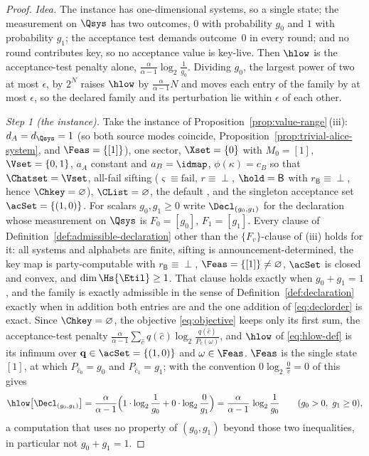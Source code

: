 \begin{proof}
\emph{Idea.} The instance has one-dimensional systems, so a single state;
the measurement on $\Qsys$ has two outcomes, $0$ with probability $g_0$
and $1$ with probability $g_1$; the acceptance test demands outcome~$0$ in
every round; and no round contributes key, so no acceptance value is
key-live. Then $\hlow$ is the acceptance-test penalty alone,
$\frac{\alpha}{\alpha-1}\log_2\frac1{g_0}$. Dividing $g_0$, the largest
power of two at most $\epsilon$, by $2^{N}$ raises $\hlow$ by
$\frac{\alpha}{\alpha-1}N$ and moves each entry of the family by at most
$\epsilon$, so the declared family and its perturbation lie within
$\epsilon$ of each other.

\emph{Step 1 (the instance).} Take the instance of
Proposition~\ref{prop:value-range}\,(iii): $d_A=d_{\Qsys}=1$ (so both source modes
coincide, Proposition~\ref{prop:trivial-alice-system}, and $\Feas=\{[1]\}$), one
sector, $\Xset=\{0\}$ with $M_0=[1]$, $\Vset=\{0,1\}$, $a_A$ constant and
$a_B=\idmap$, $\phi(\kappa)=c_B$ so that $\Chatset=\Vset$, all-fail
sifting ($\varsigma\equiv\mathrm{fail}$, $r\equiv\perp$, $\hold=\mathsf B$
with $r_{\mathsf B}\equiv\perp$, hence $\Chkey=\varnothing$),
$\CList=\varnothing$, the default , and the singleton
acceptance set $\acSet=\{(1,0)\}$. For scalars $g_0,g_1\ge0$ write
$\Decl_{(g_0,g_1)}$ for the declaration whose measurement on $\Qsys$ is
$F_0=[g_0]$, $F_1=[g_1]$. Every clause of Definition~\ref{def:admissible-declaration} other
than the $\{F_v\}$-clause of (iii) holds for it: all systems and
alphabets are finite, sifting is announcement-determined, the key map is
party-computable with $r_{\mathsf B}\equiv\perp$,
$\Feas=\{[1]\}\ne\varnothing$, $\acSet$ is closed and convex, and
$\dim\Hs{\Etil}\ge1$. That clause holds exactly when $g_0+g_1=1$, and the
family is exactly admissible in the sense of
Definition~\ref{def:declaration} exactly when in addition both entries are
 and the one addition of \eqref{eq:declorder} is exact.
Since $\Chkey=\varnothing$, the objective \eqref{eq:objective} keeps only
its first sum, the acceptance-test penalty
$\frac{\alpha}{\alpha-1}\sum_{\hat c}q(\hat c)\log_2\frac{q(\hat c)}{P_{\hat c}(\omega)}$,
and $\hlow$ of \eqref{eq:hlow-def} is its infimum over
$\mathbf q\in\acSet=\{(1,0)\}$ and $\omega\in\Feas$. $\Feas$ is the single
state $[1]$, at which $P_{\hat c_0}=g_0$ and $P_{\hat c_1}=g_1$; with the
convention $0\log_2\frac0v=0$ of  this gives
\begin{equation}\label{eq:optol-instance}
  \hlow\big[\Decl_{(g_0,g_1)}\big]
  =\frac{\alpha}{\alpha-1}\Big(1\cdot\log_2\frac1{g_0}
  +0\cdot\log_2\frac{0}{g_1}\Big)
  =\frac{\alpha}{\alpha-1}\,\log_2\frac1{g_0}
  \qquad (g_0>0,\ g_1\ge0),
\end{equation}
a computation that uses no property of $(g_0,g_1)$ beyond those two
inequalities, in particular not $g_0+g_1=1$.


\end{proof}
